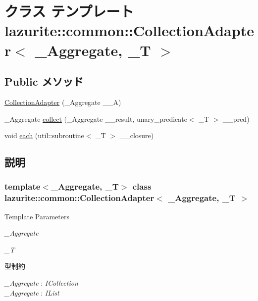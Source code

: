 \hypertarget{classlazurite_1_1common_1_1_collection_adapter_3_01___aggregate_00_01___t_01_4}{
\section{クラス テンプレート lazurite::common::CollectionAdapter$<$ \_\-Aggregate, \_\-T $>$}
\label{classlazurite_1_1common_1_1_collection_adapter_3_01___aggregate_00_01___t_01_4}
}
\subsection*{Public メソッド}
\begin{DoxyCompactItemize}
\item 
\hyperlink{classlazurite_1_1common_1_1_collection_adapter_3_01___aggregate_00_01___t_01_4_af484e35759c379cd28dafc99dd106954}{CollectionAdapter} (\_\-Aggregate \_\-\_\-A)
\item 
\_\-Aggregate \hyperlink{classlazurite_1_1common_1_1_collection_adapter_3_01___aggregate_00_01___t_01_4_aff02ea67eae85b44be1905195aab427a}{collect} (\_\-Aggregate \_\-\_\-result, unary\_\-predicate$<$ \_\-T $>$ \_\-\_\-pred)
\item 
void \hyperlink{classlazurite_1_1common_1_1_collection_adapter_3_01___aggregate_00_01___t_01_4_a94683b605b7d99bd6599591214225d5f}{each} (util::subroutine$<$ \_\-T $>$ \_\-\_\-closure)
\end{DoxyCompactItemize}


\subsection{説明}
\subsubsection*{template$<$\_\-Aggregate, \_\-T$>$ class lazurite::common::CollectionAdapter$<$ \_\-Aggregate, \_\-T $>$}


\begin{DoxyTemplParams}{Template Parameters}
\item[{\em \_\-Aggregate}]\item[{\em \_\-T}]\end{DoxyTemplParams}
\begin{Desc}
\item[型制約]\begin{description}
\item[{\em \_\-Aggregate} : {\em ICollection}]\item[{\em \_\-Aggregate} : {\em IList}]\end{description}
\end{Desc}


